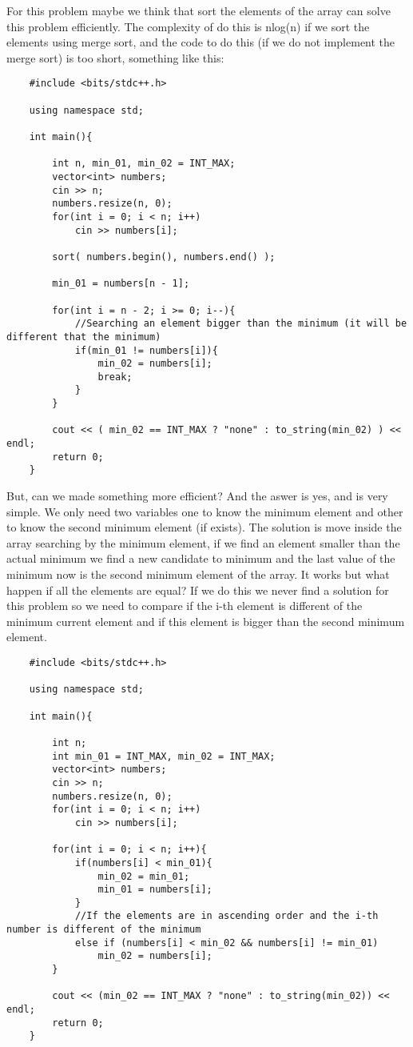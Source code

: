 For this problem maybe we think that sort the elements of the array can solve this problem efficiently. The complexity of do this is nlog(n) if we sort the elements using merge sort, and the code to do this (if we do not implement the merge sort) is too short, something like this:
\begin{lstlisting}
    #include <bits/stdc++.h>

    using namespace std;

    int main(){

        int n, min_01, min_02 = INT_MAX;
        vector<int> numbers;
        cin >> n;
        numbers.resize(n, 0);
        for(int i = 0; i < n; i++)
            cin >> numbers[i];

        sort( numbers.begin(), numbers.end() );

        min_01 = numbers[n - 1];
        
        for(int i = n - 2; i >= 0; i--){
            //Searching an element bigger than the minimum (it will be different that the minimum)
            if(min_01 != numbers[i]){
                min_02 = numbers[i];
                break;
            }
        }

        cout << ( min_02 == INT_MAX ? "none" : to_string(min_02) ) << endl;
        return 0;
    }
\end{lstlisting}

But, can we made something more efficient? And the aswer is yes, and is very simple. We only need two variables one to know the minimum element and other to know the second minimum element (if exists). 
The solution is move inside the array searching by the minimum element, if we find an element smaller than the actual minimum we find a new candidate to minimum and the last value of the minimum now is the second minimum element of the array.
It works but what happen if all the elements are equal? If we do this we never find a solution for this problem so we need to compare if the i-th element is different of the minimum current element and if this element is bigger than the second minimum element.

\begin{lstlisting}
    #include <bits/stdc++.h>

    using namespace std;

    int main(){

        int n;
        int min_01 = INT_MAX, min_02 = INT_MAX;
        vector<int> numbers;
        cin >> n;
        numbers.resize(n, 0);
        for(int i = 0; i < n; i++)
            cin >> numbers[i];

        for(int i = 0; i < n; i++){
            if(numbers[i] < min_01){
                min_02 = min_01;
                min_01 = numbers[i];
            } 
            //If the elements are in ascending order and the i-th number is different of the minimum
            else if (numbers[i] < min_02 && numbers[i] != min_01)
                min_02 = numbers[i];
        }

        cout << (min_02 == INT_MAX ? "none" : to_string(min_02)) << endl;
        return 0;
    }
\end{lstlisting}